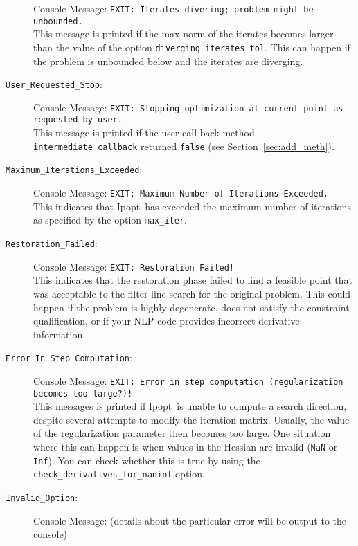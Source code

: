 \documentclass[10pt]{article}
\newcommand{\Ipopt}{{\sc Ipopt}}
\begin{document}
\begin{description}
  Console Message: {\tt EXIT: Iterates divering; problem might be
    unbounded.} \\
  This message is printed if the max-norm of the iterates becomes
  larger than the value of the option {\tt diverging\_iterates\_tol}.
  This can happen if the problem is unbounded below and the iterates
  are diverging.
\item[{\tt User\_Requested\_Stop}:]  $\;$ \\
  Console Message: {\tt EXIT: Stopping optimization at current point
    as requested by user.} \\
  This message is printed if the user call-back method {\tt
    intermediate\_callback} returned {\tt false} (see
  Section~\ref{sec:add_meth}).
\item[{\tt Maximum\_Iterations\_Exceeded}:]  $\;$ \\
  Console Message: {\tt EXIT: Maximum Number of Iterations Exceeded.} \\
  This indicates that \Ipopt\ has exceeded the maximum number of
  iterations as specified by the option {\tt max\_iter}.
\item[{\tt Restoration\_Failed}:]  $\;$ \\
  Console Message: {\tt EXIT: Restoration Failed!} \\
  This indicates that the restoration phase failed to find a feasible
  point that was acceptable to the filter line search for the original
  problem. This could happen if the problem is highly degenerate, does
  not satisfy the constraint qualification, or if your NLP code
  provides incorrect derivative information.
\item[{\tt Error\_In\_Step\_Computation}:]  $\;$ \\
  Console Message: {\tt EXIT: Error in step computation (regularization becomes too large?)!} \\
  This messages is printed if \Ipopt\ is unable to compute a search
  direction, despite several attempts to modify the iteration matrix.
  Usually, the value of the regularization parameter then becomes too
  large.  One situation where this can happen is when values in the
  Hessian are invalid ({\tt NaN} or {\tt Inf}).  You can check whether this
  is true by using the {\tt check\_derivatives\_for\_naninf} option.
\item[{\tt Invalid\_Option}:]  $\;$ \\
  Console Message: (details about the particular error
  will be output to the console) \\

\end{description}
\end{document}
